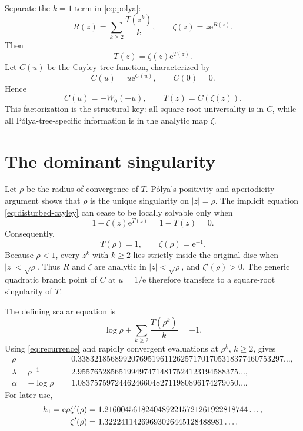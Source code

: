 \documentclass[11pt]{article}
\theoremstyle{definition}
\theoremstyle{remark}
\newcommand{\e}{\mathrm e}
\begin{document}
Separate the $k=1$ term in \cref{eq:polya}:
\begin{equation}
 R(z)=\sum_{k\geq2}\frac{T(z^k)}{k},
 \qquad
 \zeta(z)=z\e^{R(z)}.
 \label{eq:R-zeta}
\end{equation}
Then
\begin{equation}
 T(z)=\zeta(z)\e^{T(z)}.
 \label{eq:disturbed-cayley}
\end{equation}
Let $C(u)$ be the Cayley tree function, characterized by
\begin{equation}
 C(u)=u\e^{C(u)},\qquad C(0)=0.
 \label{eq:cayley}
\end{equation}
Hence
\begin{equation}
 C(u)=-W_0(-u),
 \qquad
 T(z)=C(\zeta(z)).
 \label{eq:cayley-composition}
\end{equation}
This factorization is the structural key: all square-root universality is in
$C$, while all P\'olya-tree-specific information is in the analytic map
$\zeta$.

\section{The dominant singularity}
\label{sec:dominant}

Let $\rho$ be the radius of convergence of $T$.  P\'olya's positivity and
aperiodicity argument shows that $\rho$ is the unique singularity on
$|z|=\rho$.  The implicit equation \cref{eq:disturbed-cayley} can cease to
be locally solvable only when
\[
 1-\zeta(z)\e^{T(z)}=1-T(z)=0.
\]
Consequently,
\begin{equation}
 T(\rho)=1,
 \qquad
 \zeta(\rho)=\e^{-1}.
 \label{eq:critical}
\end{equation}
Because $\rho<1$, every $z^k$ with $k\geq2$ lies strictly inside the original
disc when $|z|<\sqrt\rho$.  Thus $R$ and $\zeta$ are analytic in
$|z|<\sqrt\rho$, and $\zeta'(\rho)>0$.  The generic quadratic branch point of
$C$ at $u=1/\e$ therefore transfers to a square-root singularity of $T$.

The defining scalar equation is
\begin{equation}
 \log\rho+\sum_{k\geq2}\frac{T(\rho^k)}{k}=-1.
 \label{eq:rho-equation}
\end{equation}
Using \cref{eq:recurrence} and rapidly convergent evaluations at $\rho^k$,
$k\geq2$, gives
\begin{align}
 \rho&=0.33832185689920769519611262571701705318377460753297\ldots,
 \label{eq:rho-value}\\
 \lambda=\rho^{-1}
 &=2.955765285651994974714817524123194588375\ldots,\\
 \alpha=-\log\rho
 &=1.083757597244624660482711980896174279050\ldots.
\end{align}
For later use,
\begin{align}
 h_1=\e\rho\zeta'(\rho)
 &=1.21600456182404892215721261922818744\ldots,\notag\\
 \zeta'(\rho)
 &=1.32224114269693026445128488981\ldots.
 \label{eq:h1-value}
\end{align}
\end{document}
